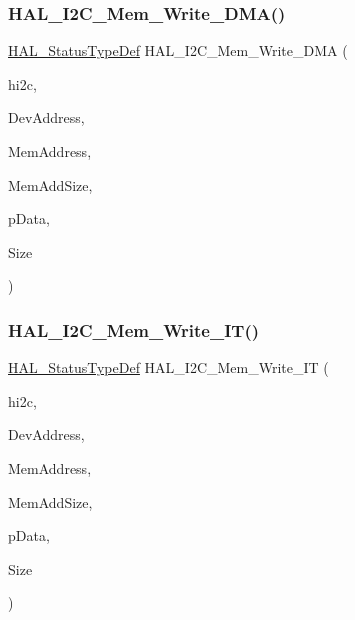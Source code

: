 \subsubsection{\texorpdfstring{H\+A\+L\+\_\+\+I2\+C\+\_\+\+Mem\+\_\+\+Write\+\_\+\+D\+M\+A()}{HAL\_I2C\_Mem\_Write\_DMA()}}
{\footnotesize\ttfamily \hyperlink{stm32f4xx__hal__def_8h_a63c0679d1cb8b8c684fbb0632743478f}{H\+A\+L\+\_\+\+Status\+Type\+Def} H\+A\+L\+\_\+\+I2\+C\+\_\+\+Mem\+\_\+\+Write\+\_\+\+D\+MA (\begin{DoxyParamCaption}\item[{\hyperlink{group___i2_c__handle___structure__definition_ga68e9f45c2fd2161fb827ccdeabb55ea5}{I2\+C\+\_\+\+Handle\+Type\+Def} $\ast$}]{hi2c,  }\item[{uint16\+\_\+t}]{Dev\+Address,  }\item[{uint16\+\_\+t}]{Mem\+Address,  }\item[{uint16\+\_\+t}]{Mem\+Add\+Size,  }\item[{uint8\+\_\+t $\ast$}]{p\+Data,  }\item[{uint16\+\_\+t}]{Size }\end{DoxyParamCaption})}

\mbox{\label{group___i2_c___exported___functions___group2_gab57ffc32b01392d8bcce3c7ec32b3120}} 
\subsubsection{\texorpdfstring{H\+A\+L\+\_\+\+I2\+C\+\_\+\+Mem\+\_\+\+Write\+\_\+\+I\+T()}{HAL\_I2C\_Mem\_Write\_IT()}}
{\footnotesize\ttfamily \hyperlink{stm32f4xx__hal__def_8h_a63c0679d1cb8b8c684fbb0632743478f}{H\+A\+L\+\_\+\+Status\+Type\+Def} H\+A\+L\+\_\+\+I2\+C\+\_\+\+Mem\+\_\+\+Write\+\_\+\+IT (\begin{DoxyParamCaption}\item[{\hyperlink{group___i2_c__handle___structure__definition_ga68e9f45c2fd2161fb827ccdeabb55ea5}{I2\+C\+\_\+\+Handle\+Type\+Def} $\ast$}]{hi2c,  }\item[{uint16\+\_\+t}]{Dev\+Address,  }\item[{uint16\+\_\+t}]{Mem\+Address,  }\item[{uint16\+\_\+t}]{Mem\+Add\+Size,  }\item[{uint8\+\_\+t $\ast$}]{p\+Data,  }\item[{uint16\+\_\+t}]{Size }\end{DoxyParamCaption})}

